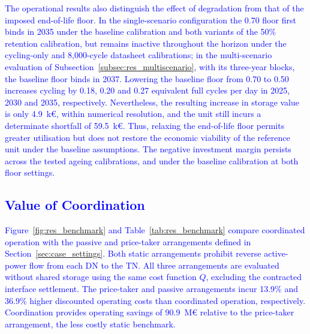 \documentclass[preprint,12pt]{elsarticle}
\begin{document}
\textcolor{blue}{
    The operational results also distinguish the effect of degradation from that of the imposed end-of-life floor. In the single-scenario configuration the 0.70 floor first binds in 2035 under the baseline calibration and both variants of the 50\% retention calibration, but remains inactive throughout the horizon under the cycling-only and 8{,}000-cycle datasheet calibrations; in the multi-scenario evaluation of Subsection~\ref{subsec:res_multiscenario}, with its three-year blocks, the baseline floor binds in 2037. Lowering the baseline floor from 0.70 to 0.50 increases cycling by 0.18, 0.20 and 0.27 equivalent full cycles per day in 2025, 2030 and 2035, respectively. Nevertheless, the resulting increase in storage value is only 4.9~k\euro{}, within numerical resolution, and the unit still incurs a determinate shortfall of 59.5~k\euro{}. Thus, relaxing the end-of-life floor permits greater utilisation but does not restore the economic viability of the reference unit under the baseline assumptions. The negative investment margin persists across the tested ageing calibrations, and under the baseline calibration at both floor settings.
}

\subsection{\textcolor{blue}{Value of Coordination}}
\label{subsec:res_coordination}

\textcolor{blue}{
    Figure~\ref{fig:res_benchmark} and Table~\ref{tab:res_benchmark} compare coordinated operation with the passive and price-taker arrangements defined in Section~\ref{sec:case_settings}. Both static arrangements prohibit reverse active-power flow from each DN to the TN. 
    All three arrangements are evaluated without shared storage using the same cost function $Q$, excluding the contracted interface settlement.
    The price-taker and passive arrangements incur 13.9\% and 36.9\% higher discounted operating costs than coordinated operation, respectively.
    Coordination provides operating savings of 90.9~M\euro{} relative to the price-taker arrangement, the less costly static benchmark.
}
\end{document}
